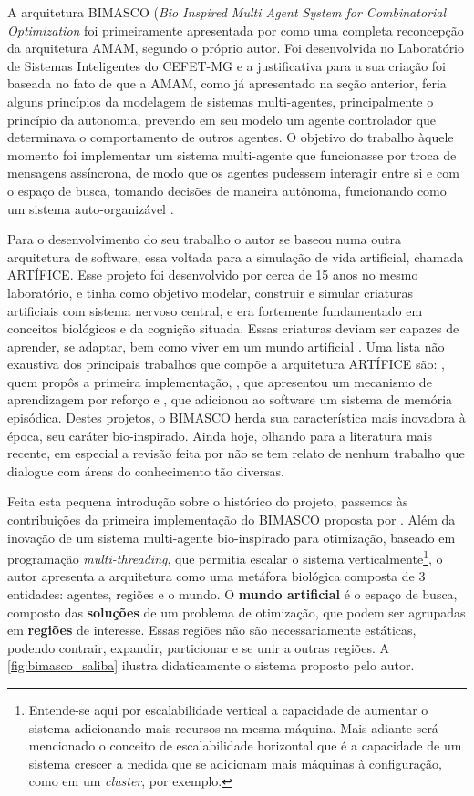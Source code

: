 A arquitetura BIMASCO (\textit{Bio Inspired Multi Agent System for Combinatorial Optimization} foi primeiramente apresentada por  como uma completa reconcepção da arquitetura AMAM, segundo o próprio autor. Foi desenvolvida no Laboratório de Sistemas Inteligentes do CEFET-MG e a justificativa para a sua criação foi baseada no fato de que a AMAM, como já apresentado na seção anterior, feria alguns princípios da modelagem de sistemas multi-agentes, principalmente o princípio da autonomia, prevendo em seu modelo um agente controlador que determinava o comportamento de outros agentes. O objetivo do trabalho àquele momento foi implementar um sistema multi-agente que funcionasse por troca de mensagens assíncrona, de modo que os agentes pudessem interagir entre si e com o espaço de busca, tomando decisões de maneira autônoma, funcionando como um sistema auto-organizável \cite{saliba2010}. 

Para o desenvolvimento do seu trabalho o autor se baseou numa outra arquitetura de software, essa voltada para a simulação de vida artificial, chamada ARTÍFICE. Esse projeto foi desenvolvido por cerca de 15 anos no mesmo laboratório, e tinha como objetivo modelar, construir e simular criaturas artificiais com sistema nervoso central, e era fortemente fundamentado em conceitos biológicos e da cognição situada. Essas criaturas deviam ser capazes de aprender, se adaptar, bem como viver em um mundo artificial \cite{santos2003}. Uma lista não exaustiva dos principais trabalhos que compõe a arquitetura ARTÍFICE são: , quem propôs a primeira implementação, , que apresentou um mecanismo de aprendizagem por reforço e , que adicionou ao software um sistema de memória episódica. 
Destes projetos, o BIMASCO herda sua característica mais inovadora à época, seu caráter bio-inspirado. Ainda hoje, olhando para a literatura mais recente, em especial a revisão feita por  não se tem relato de nenhum trabalho que dialogue com áreas do conhecimento tão diversas. 

Feita esta pequena introdução sobre o histórico do projeto, passemos às contribuições da primeira implementação do BIMASCO proposta por . Além da inovação de um sistema multi-agente bio-inspirado para otimização, baseado em programação \textit{multi-threading}, que permitia escalar o sistema verticalmente\footnote{Entende-se aqui por escalabilidade vertical a capacidade de aumentar o sistema adicionando mais recursos na mesma máquina. Mais adiante será mencionado o conceito de escalabilidade horizontal que é a capacidade de um sistema crescer a medida que se adicionam mais máquinas à configuração, como em um \textit{cluster}, por exemplo.}, o autor apresenta a arquitetura como uma metáfora biológica composta de 3 entidades: agentes, regiões e o mundo. O \textbf{mundo artificial} é o espaço de busca, composto das \textbf{soluções} de um problema de otimização, que podem ser agrupadas em \textbf{regiões} de interesse. Essas regiões não são necessariamente estáticas, podendo contrair, expandir, particionar e se unir a outras regiões. A \autoref{fig:bimasco_saliba} ilustra didaticamente o sistema proposto pelo autor. 

